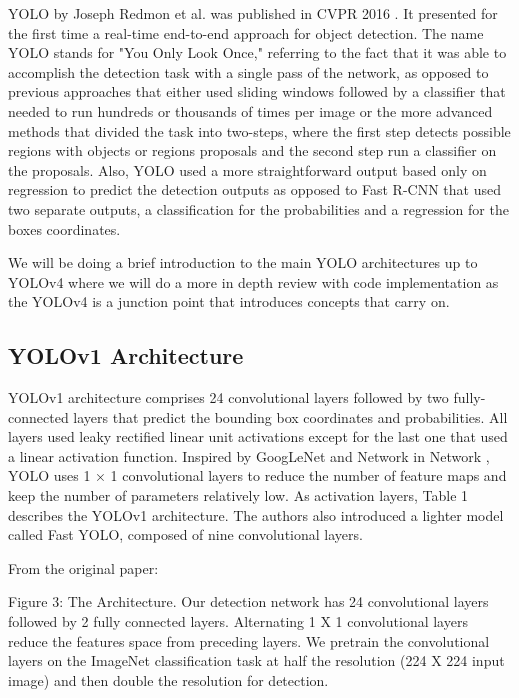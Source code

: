 \documentclass{article}
\begin{document}
YOLO by Joseph Redmon et al. was published in CVPR 2016 \cite{redmon2016you}. It presented for the first time a real-time end-to-end approach for object detection. The name YOLO stands for "You Only Look Once," referring to the fact that it was able to accomplish the detection task with a single pass of the network, as opposed to previous approaches that either used sliding windows followed by a classifier that needed to run hundreds or thousands of times per image or the more advanced methods that divided the task into two-steps, where the first step detects possible regions with objects or regions proposals and the second step run a classifier on the proposals. Also, YOLO used a more straightforward output based only on regression to predict the detection outputs as opposed to Fast R-CNN \cite{7410526} that used two separate outputs, a classification for the probabilities and a regression for the boxes coordinates.

We will be doing a brief introduction to the main YOLO architectures up to YOLOv4 where we will do a more in depth review with code implementation as the YOLOv4 is a junction point that introduces concepts that carry on.

\subsection{YOLOv1 Architecture}


YOLOv1 architecture comprises 24 convolutional layers followed by two fully-connected layers that predict the bounding box coordinates and probabilities. All layers used leaky rectified linear unit activations \cite{maas2013rectifier} except for the last one that used a linear activation function. Inspired by GoogLeNet \cite{szegedy2015going} and Network in Network \cite{lin2013network}, YOLO uses 1 × 1 convolutional layers to reduce the number of feature maps and keep the number of parameters relatively low. As activation layers, Table 1 describes the YOLOv1 architecture. The authors also introduced a lighter model called Fast YOLO, composed of nine convolutional layers.

From the original paper:

Figure 3: The Architecture. Our detection network has 24 convolutional layers followed by 2 fully connected layers. Alternating 1 X 1 convolutional layers reduce the features space from preceding layers. We pretrain the convolutional layers on the ImageNet classification task at half the resolution (224 X 224 input image) and then double the resolution for detection.
\end{document}
